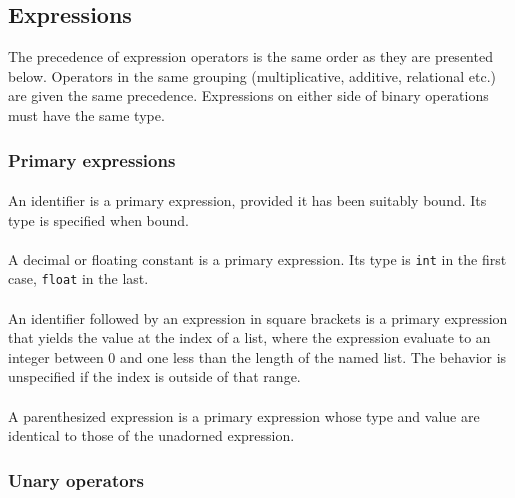 \subsection{Expressions}

The precedence of expression operators is the same order as they are presented below. Operators in the same grouping (multiplicative, additive, relational etc.) are given the same precedence. Expressions on either side of binary operations must have the same type. 

\subsubsection{Primary expressions}

\paragraph{}
An identifier is a primary expression, provided it has been suitably bound. Its type is specified when bound. 

\paragraph{}
A decimal or floating constant is a primary expression. Its type is \texttt{int} in the first case, \texttt{float} in the last. 

\paragraph{\term{[}\term{]}}
An identifier followed by an expression in square brackets is a primary expression that yields the value at the  index of a list, where the expression evaluate to an integer between 0 and one less than the length of the named list. The behavior is unspecified if the index is outside of that range. 

\paragraph{\term{(}  \term{)}}
A parenthesized expression is a primary expression whose type and value are identical to those of the unadorned expression. 

\subsubsection{Unary operators}


